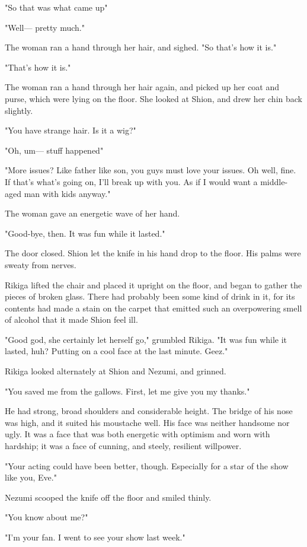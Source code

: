 "So that was what came up\el "

"Well--- pretty much."

The woman ran a hand through her hair, and sighed. "So that's how it
is."

"That's how it is."

The woman ran a hand through her hair again, and picked up her coat and
purse, which were lying on the floor. She looked at Shion, and drew her
chin back slightly.

"You have strange hair. Is it a wig?"

"Oh, um--- stuff happened\el "

"More issues? Like father like son, you guys must love your issues. Oh
well, fine. If that's what's going on, I'll break up with you. As if I
would want a middle-aged man with kids anyway."

The woman gave an energetic wave of her hand.

"Good-bye, then. It was fun while it lasted."

The door closed. Shion let the knife in his hand drop to the floor. His
palms were sweaty from nerves.

Rikiga lifted the chair and placed it upright on the floor, and began to
gather the pieces of broken glass. There had probably been some kind of
drink in it, for its contents had made a stain on the carpet that
emitted such an overpowering smell of alcohol that it made Shion feel
ill.

"Good god, she certainly let herself go," grumbled Rikiga. "It was fun
while it lasted, huh? Putting on a cool face at the last minute. Geez."

Rikiga looked alternately at Shion and Nezumi, and grinned.

"You saved me from the gallows. First, let me give you my thanks."

He had strong, broad shoulders and considerable height. The bridge of
his nose was high, and it suited his moustache well. His face was
neither handsome nor ugly. It was a face that was both energetic with
optimism and worn with hardship; it was a face of cunning, and steely,
resilient willpower.

"Your acting could have been better, though. Especially for a star of
the show like you, Eve."

Nezumi scooped the knife off the floor and smiled thinly.

"You know about me?"

"I'm your fan. I went to see your show last week."

